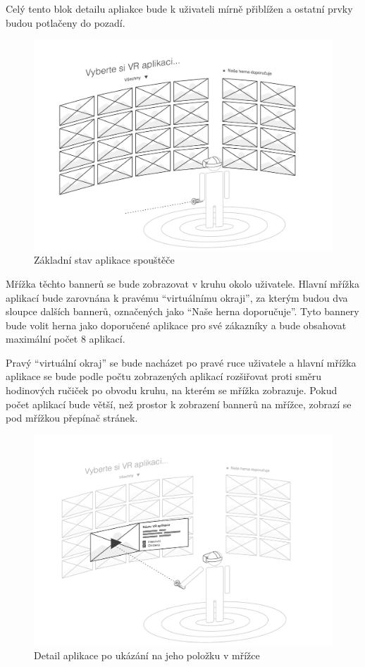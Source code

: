 Celý tento blok
detailu apliakce bude k uživateli mírně přiblížen a ostatní prvky budou
potlačeny do pozadí.

\begin{figure}[h!]
\centering
\includegraphics[width=\textwidth]{src/assets/wireframe-grid.pdf}
\caption{Základní stav aplikace spouštěče}
\end{figure}

Mřížka těchto bannerů se bude zobrazovat v kruhu okolo uživatele. Hlavní
mřížka aplikací bude zarovnána k pravému ``virtuálnímu okraji'', za
kterým budou dva sloupce dalších bannerů, označených jako ``Naše herna
doporučuje''. Tyto bannery bude volit herna jako doporučené aplikace pro
své zákazníky a bude obsahovat maximální počet 8 aplikací. 

Pravý ``virtuální okraj'' se bude nacházet po pravé ruce uživatele a hlavní
mřížka aplikace se bude podle počtu zobrazených aplikací rozšiřovat
proti směru hodinových ručiček po obvodu kruhu, na kterém se mřížka
zobrazuje. Pokud počet aplikací bude větší, než prostor k zobrazení
bannerů na mřížce, zobrazí se pod mřížkou přepínač stránek.

\begin{figure}[h!]
\centering
\includegraphics[width=\textwidth]{src/assets/wireframe-detail.pdf}
\caption{Detail aplikace po ukázání na jeho položku v mřížce}
\end{figure}

